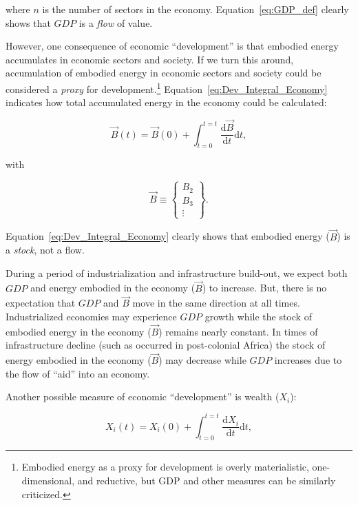 \noindent{}where $n$ is the number of sectors in the economy.
Equation~\ref{eq:GDP_def} clearly shows that 
$GDP$ is a \emph{flow} of value.

However, one consequence of economic ``development'' 
is that embodied energy accumulates 
in economic sectors and society. 
If we turn this around, 
accumulation of embodied energy in economic sectors and society 
could be considered a \emph{proxy} for development.\footnote{Embodied energy 
as a proxy for development is overly materialistic, 
one-dimensional, and reductive, 
but GDP and other measures can be similarly criticized.}
Equation~\ref{eq:Dev_Integral_Economy} indicates how total accumulated
energy in the economy could be calculated:

\begin{equation} \label{eq:Dev_Integral_Economy}
	\vec{B}(t) 
	= \vec{B}(0) 
	+ \int_{t=0}^{t=t} \frac{\mathrm{d}\vec{B}}{\mathrm{d}t}\mathrm{d}t,
\end{equation}

\noindent{}with

\begin{equation}
	\vec{B}
	\equiv 
	\begin{Bmatrix}
		B_{2}	\\
		B_{3}	\\
		\vdots
	\end{Bmatrix}.
\end{equation}

\noindent{}Equation~\ref{eq:Dev_Integral_Economy} clearly shows
that embodied energy ($\vec{B}$) is a \emph{stock}, not a flow.

During a period of industrialization and infrastructure build-out, 
we expect both $GDP$ and energy embodied in the economy ($\vec{B}$)
to increase.
But, there is no expectation that $GDP$ and $\vec{B}$ move 
in the same direction at all times.
Industrialized economies may experience $GDP$ growth while 
the stock of embodied energy in the economy ($\vec{B}$) remains nearly constant.
In times of infrastructure decline (such as occurred in post-colonial Africa)
the stock of energy embodied in the economy ($\vec{B}$) may decrease while
$GDP$ increases due to the flow of ``aid'' into an economy.

Another possible measure of economic ``development'' is wealth ($X_{i}$):

\begin{equation} \label{eq:Dev_Integral_Wealth}
	X_{i}(t) 
	= X_{i}(0) 
	+ \int_{t=0}^{t=t} \frac{\mathrm{d}X_{i}}{\mathrm{d}t}\mathrm{d}t,
\end{equation}

